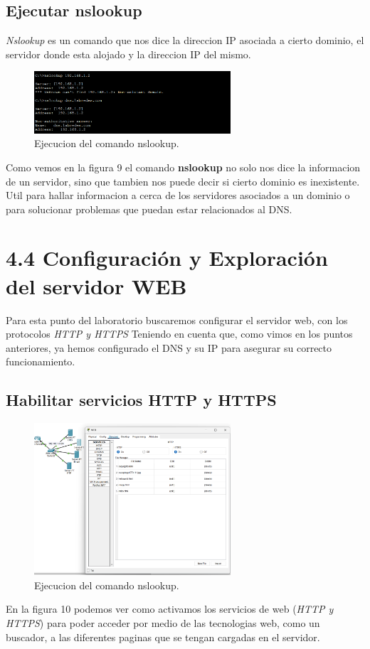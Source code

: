 \documentclass[10pt]{article}
\begin{document}
\subsection{Ejecutar nslookup}
\textit{Nslookup} es un comando que nos dice la direccion IP asociada a cierto dominio, el servidor donde esta alojado y la direccion IP del mismo. 
\begin{figure}[H]
    \centering
    \includegraphics[width=0.65\textwidth]{lab-01-screenshots/43-4-nslookup.png}
    \caption{Ejecucion del comando nslookup.}
\end{figure}
Como vemos en la figura 9 el comando \textbf{nslookup} no solo nos dice la informacion de un servidor, sino que tambien nos puede decir si cierto dominio es inexistente. Util para hallar informacion a cerca de los servidores asociados a un dominio o para solucionar problemas que puedan estar relacionados al DNS.
\section{4.4 Configuración y Exploración del servidor WEB}
Para esta punto del laboratorio buscaremos configurar el servidor web, con los protocolos \textit{HTTP y HTTPS} Teniendo en cuenta que, como vimos en los puntos anteriores, ya hemos configurado el DNS y su IP para asegurar su correcto funcionamiento.
\subsection{Habilitar servicios HTTP y HTTPS}
\begin{figure}[H]
    \centering
    \includegraphics[width=0.65\textwidth]{lab-01-screenshots/44-1-config-server.png}
    \caption{Ejecucion del comando nslookup.}
\end{figure}
En la figura 10 podemos ver como activamos los servicios de web (\textit{HTTP y HTTPS}) para poder acceder por medio de las tecnologias web, como un buscador, a las diferentes paginas que se tengan cargadas en el servidor.
\end{document}
